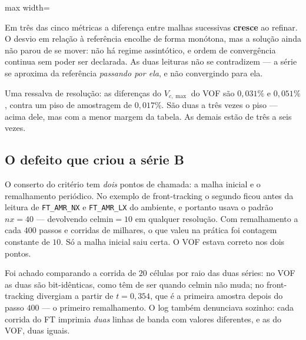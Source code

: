 \begin{adjustbox}{max width=\linewidth}
\end{adjustbox}

Em tr\^es das cinco m\'etricas a diferen\c{c}a entre malhas sucessivas
\textbf{cresce} ao refinar. O desvio em rela\c{c}\~ao \`a refer\^encia encolhe de
forma mon\'otona, mas a solu\c{c}\~ao ainda n\~ao parou de se mover: n\~ao h\'a
regime assint\'otico, e ordem de converg\^encia continua sem poder ser declarada.
As duas leituras n\~ao se contradizem --- a s\'erie se aproxima da refer\^encia
\emph{passando por ela}, e n\~ao convergindo para ela.

Uma ressalva de resolu\c{c}\~ao: as diferen\c{c}as do $V_{c,\max}$ do VOF s\~ao
$0{,}031\%$ e $0{,}051\%$, contra um piso de amostragem de $0{,}017\%$. S\~ao
duas a tr\^es vezes o piso --- acima dele, mas com a menor margem da tabela. As
demais est\~ao de tr\^es a seis vezes.

\subsection{O defeito que criou a s\'erie B}
\label{sec:conv-defeito}

O conserto do crit\'erio tem \emph{dois} pontos de chamada: a malha inicial e o
remalhamento peri\'odico. No exemplo de front-tracking o segundo ficou antes da
leitura de \texttt{FT\_AMR\_NX} e \texttt{FT\_AMR\_LX} do ambiente, e portanto
usava o padr\~ao $nx=40$ --- devolvendo $\text{celmin}=10$ em qualquer
resolu\c{c}\~ao. Com remalhamento a cada $400$ passos e corridas de milhares, o
que valeu na pr\'atica foi contagem constante de $10$. S\'o a malha inicial saiu
certa. O VOF estava correto nos dois pontos.

Foi achado comparando a corrida de $20$ c\'elulas por raio das duas s\'eries: no
VOF as duas s\~ao bit-id\^enticas, como t\^em de ser quando $\text{celmin}$ n\~ao
muda; no front-tracking divergiam a partir de $t=0{,}354$, que \'e a primeira
amostra depois do passo $400$ --- o primeiro remalhamento. O log tamb\'em
denunciava sozinho: cada corrida do FT imprimia \emph{duas} linhas de banda com
valores diferentes, e as do VOF, duas iguais.

